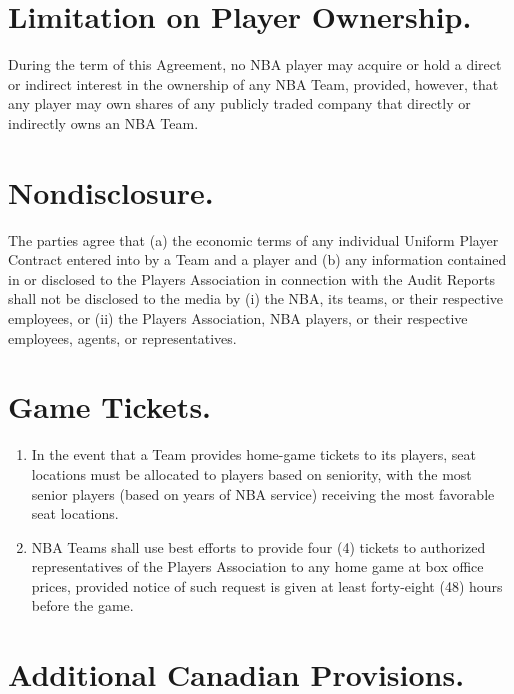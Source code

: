 \documentclass[
]{book}
\providecommand{\tightlist}{%
  \setlength{\itemsep}{0pt}\setlength{\parskip}{0pt}}
\begin{document}
\hypertarget{limitation-on-player-ownership.}{%
\section{Limitation on Player Ownership.}\label{limitation-on-player-ownership.}}

During the term of this Agreement, no NBA player may acquire or hold a direct or indirect interest in the ownership of any NBA Team, provided, however, that any player may own shares of any publicly traded company that directly or indirectly owns an NBA Team.

\hypertarget{nondisclosure.}{%
\section{Nondisclosure.}\label{nondisclosure.}}

The parties agree that (a) the economic terms of any individual Uniform Player Contract entered into by a Team and a player and (b) any information contained in or disclosed to the Players Association in connection with the Audit Reports shall not be disclosed to the media by (i) the NBA, its teams, or their respective employees, or (ii) the Players Association, NBA players, or their respective employees, agents, or representatives.

\hypertarget{game-tickets.}{%
\section{Game Tickets.}\label{game-tickets.}}

\begin{enumerate}
\def\labelenumi{(\alph{enumi})}
\tightlist
\item
  In the event that a Team provides home-game tickets to its players, seat locations must be allocated to players based on seniority, with the most senior players (based on years of NBA service) receiving the most favorable seat locations.
\item
  NBA Teams shall use best efforts to provide four (4) tickets to authorized representatives of the Players Association to any home game at box office prices, provided notice of such request is given at least forty-eight (48) hours before the game.
\end{enumerate}

\hypertarget{additional-canadian-provisions.}{%
\section{Additional Canadian Provisions.}\label{additional-canadian-provisions.}}
\end{document}
